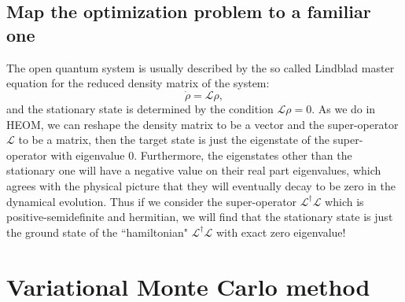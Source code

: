 \documentclass[letterpaper, 10pt]{article}
\begin{document}
\subsection{Map the optimization problem to a familiar one}
The open quantum system is usually described by the so called Lindblad master equation for the reduced density matrix of the system:
\[ \dot{\rho} = \mathcal{L} \rho, \]
and the stationary state is determined by the condition $ \mathcal{L} \rho = 0.$ As we do in HEOM, we can reshape the density matrix to be a vector and the super-operator $\mathcal{L}$ to be a matrix, then the target state is just the eigenstate of the super-operator with eigenvalue $0$. Furthermore, the eigenstates other than the stationary one will have a negative value on their real part eigenvalues, which agrees with the physical picture that they will eventually decay to be zero in the dynamical evolution. Thus if we consider the super-operator $\mathcal{L}^\dag \mathcal{L}$ which is positive-semidefinite and hermitian, we will find that the stationary state is just the ground state of the ``hamiltonian" $\mathcal{L}^\dag \mathcal{L}$ with exact zero eigenvalue!

\section{Variational Monte Carlo method}
\end{document}
